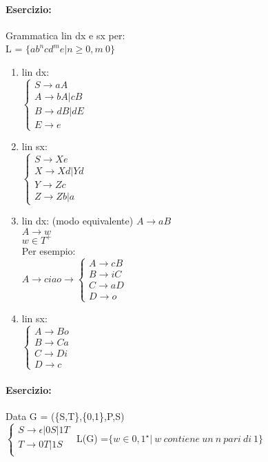 \documentclass[12pt, a4paper, openany, oneside]{book}
\begin{document}
\paragraph{Esercizio: } Grammatica lin dx e sx per: \\
L = $\{ab^{n}cd^{m}e | n \geq 0, m \> 0 \}$ \\
\begin{enumerate}
	\item lin dx: \\
	$\begin{cases}
	S \to aA \\
	A \to bA|cB \\
	B \to dB | dE \\
	E \to e 
	\end{cases}$
	\item lin sx: \\
	$\begin{cases}
	S \to Xe\\
	X \to Xd | Yd\\
	Y \to Zc \\
	Z \to Zb | a 
	\end{cases}$
	\item lin dx: (modo equivalente)
	$A \to aB$\\
	$A \to w$\\
	$w\in T^{+}$ \\
	Per esempio: \\
	$A \to ciao \to \begin{cases}
	A \to cB \\
	B \to iC \\
	C \to aD \\
	D \to o
	\end{cases} $
	\item lin sx: \\
	$\begin{cases}
	A \to Bo \\
	B \to Ca \\
	C \to Di \\
	D \to c
	\end{cases}$
\end{enumerate}
\paragraph{Esercizio: } Data G = (\{S,T\},\{0,1\},P,S)\\
$\begin{cases}
S \to \epsilon | 0S | 1T\\
T \to 0T | 1S \\
\end{cases}$
L(G) =$\{w \in {0,1}^{\star} | ~ w ~ contiene~  un~  n ~ pari~  di~  1\}$
\end{document}
